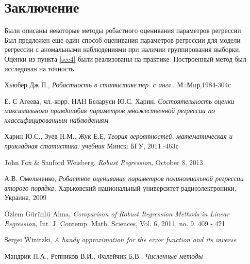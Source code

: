 \documentclass[a4paper,14pt]{extarticle}
\begin{document}
\section{Заключение}
Были описаны некоторые методы робастного оценивания параметров регрессии.
Был предложен еще один способ оценивания параметров регрессии для модели регрессии с аномальными наблюдениями при наличии группирования выборки. 
Оценки из пункта \ref{sec4} были реализованы на практике. Построенный метод был исследован на точность.
\newpage
\begin{thebibliography}{8}
    Хьюбер Дж П.,
    \textit{Робастность в статистике:пер. с англ.}.
    М.:Мир,1984-304с

    Е. С Агеева, чл.-корр. НАН Беларуси Ю.С. Харин,
    \textit{Состоятельность оценки максимального правдопобия параметров множественной регрессии по классифицированным наблюдениям}

    Харин Ю.С., Зуев Н.М.,
    Жук Е.Е,
    \textit{Теория вероятностей, математическая и прикладная статистика: учебник}
    Минск: БГУ, 2011.-463с

    John Fox \& Sanford Weisberg,
    \textit{Robust Regression},
    October 8, 2013

    А.В. Омельченко,
    \textit{Робастное оценивание параметров полиномиальной регрессии второго порядка,}
    Харьковский национальный университет радиоэлектроники, Украина, 2009

    \"{O}zlem G\"{u}r\"{u}nl\"{u} Alma,
    \textit{Comparison of Robust Regression Methods
    in Linear Regression},
    Int. J. Contemp. Math. Sciences, Vol. 6, 2011, no. 9, 409 - 421

    Sergei Winitzki,
    \textit{A handy approximation for the error function and its inverse}

    Мандрик П.А., Репников В.И., Фалейчик Б.В.,
    \textit{Численные методы}
\end{thebibliography}
\end{document}

